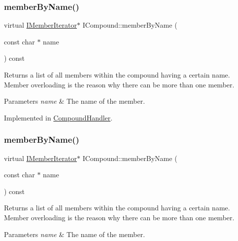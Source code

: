 \mbox{\label{class_i_compound_af94f0805a794ec5f413c9e16347e2591}} 
\subsubsection{\texorpdfstring{memberByName()}{memberByName()}\hspace{0.1cm}{\footnotesize\ttfamily [1/2]}}
{\footnotesize\ttfamily virtual \mbox{\hyperlink{class_i_member_iterator}{I\+Member\+Iterator}}$\ast$ I\+Compound\+::member\+By\+Name (\begin{DoxyParamCaption}\item[{const char $\ast$}]{name }\end{DoxyParamCaption}) const\hspace{0.3cm}{\ttfamily [pure virtual]}}

Returns a list of all members within the compound having a certain name. Member overloading is the reason why there can be more than one member. 
\begin{DoxyParams}{Parameters}
{\em name} & The name of the member. \\
\hline
\end{DoxyParams}


Implemented in \mbox{\hyperlink{class_compound_handler_afc374b0797b025ba660c558ca1d73137}{Compound\+Handler}}.

\mbox{\label{class_i_compound_af94f0805a794ec5f413c9e16347e2591}} 
\subsubsection{\texorpdfstring{memberByName()}{memberByName()}\hspace{0.1cm}{\footnotesize\ttfamily [2/2]}}
{\footnotesize\ttfamily virtual \mbox{\hyperlink{class_i_member_iterator}{I\+Member\+Iterator}}$\ast$ I\+Compound\+::member\+By\+Name (\begin{DoxyParamCaption}\item[{const char $\ast$}]{name }\end{DoxyParamCaption}) const\hspace{0.3cm}{\ttfamily [pure virtual]}}

Returns a list of all members within the compound having a certain name. Member overloading is the reason why there can be more than one member. 
\begin{DoxyParams}{Parameters}
{\em name} & The name of the member. \\
\hline
\end{DoxyParams}



